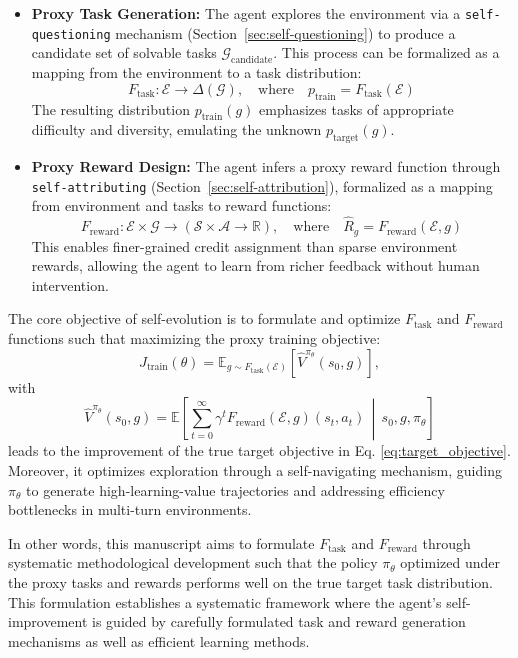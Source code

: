 \begin{itemize}
    \item \textbf{Proxy Task Generation:} The agent explores the environment via a \texttt{self-questioning} mechanism (Section~\ref{sec:self-questioning}) to produce a candidate set of solvable tasks $\mathcal{G}_{\text{candidate}}$. This process can be formalized as a mapping from the environment to a task distribution:
    \begin{equation}
    \label{eq:task_mapping}
    F_{\text{task}}: \mathcal{E} \to \Delta(\mathcal{G}), \quad \text{where} \quad p_{\text{train}} = F_{\text{task}}(\mathcal{E})
    \end{equation}
    The resulting distribution $p_{\text{train}}(g)$ emphasizes tasks of appropriate difficulty and diversity, emulating the unknown $p_{\text{target}}(g)$.

    \item \textbf{Proxy Reward Design:} The agent infers a proxy reward function through \texttt{self-attributing} (Section~\ref{sec:self-attribution}), formalized as a mapping from environment and tasks to reward functions:
    \begin{equation}
    \label{eq:reward_mapping}
    F_{\text{reward}}: \mathcal{E} \times \mathcal{G} \to (\mathcal{S} \times \mathcal{A} \to \mathbb{R}), \quad \text{where} \quad \hat{R}_g = F_{\text{reward}}(\mathcal{E}, g)
    \end{equation}
    This enables finer-grained credit assignment than sparse environment rewards, allowing the agent to learn from richer feedback without human intervention.
\end{itemize}

The core objective of self-evolution is to formulate and optimize $F_{\text{task}}$ and $F_{\text{reward}}$ functions such that maximizing the proxy training objective:
\begin{equation}
\label{eq:train_objective}
J_{\text{train}}(\theta) = \mathbb{E}_{g \sim F_{\text{task}}(\mathcal{E})} \left[ \hat{V}^{\pi_\theta}(s_0, g) \right],
\end{equation}
with 
\begin{equation}
\label{eq:proxy_value}
\hat{V}^{\pi_\theta}(s_0, g) = \mathbb{E} \left[ \sum_{t=0}^{\infty} \gamma^t F_{\text{reward}}(\mathcal{E}, g)(s_t, a_t) \,\middle|\, s_0, g, \pi_\theta \right]
\end{equation}
leads to the improvement of the true target objective in Eq. \ref{eq:target_objective}. Moreover, it optimizes exploration through a self-navigating mechanism, guiding $\pi_\theta$ to generate high-learning-value trajectories and addressing efficiency bottlenecks in multi-turn environments.

In other words, this manuscript aims to formulate $F_{\text{task}}$ and $F_{\text{reward}}$ through systematic methodological development such that the policy $\pi_\theta$ optimized under the proxy tasks and rewards performs well on the true target task distribution. This formulation establishes a systematic framework where the agent's self-improvement is guided by carefully formulated task and reward generation mechanisms as well as efficient learning methods.